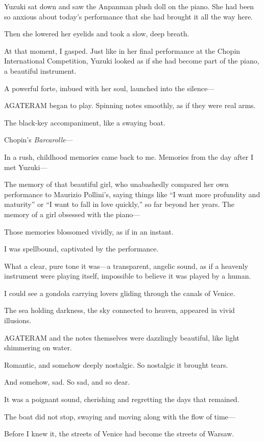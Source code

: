 \documentclass[
    a4paper,
    12pt,
    twoside,
    openany,
    UTF8,
    fontset=windows
]{ctexbook}
\begin{document}
Yuzuki sat down and saw the Anpanman plush doll on the piano. She had been so anxious about today's performance that she had brought it all the way here.

Then she lowered her eyelids and took a slow, deep breath.

At that moment, I gasped. Just like in her final performance at the Chopin International Competition, Yuzuki looked as if she had become part of the piano, a beautiful instrument.

A powerful forte, imbued with her soul, launched into the silence---

AGATERAM began to play. Spinning notes smoothly, as if they were real arms.

The black-key accompaniment, like a swaying boat.

Chopin's \textit{Barcarolle}---

In a rush, childhood memories came back to me. Memories from the day after I met Yuzuki---

The memory of that beautiful girl, who unabashedly compared her own performance to Maurizio Pollini's, saying things like ``I want more profundity and maturity'' or ``I want to fall in love quickly,'' so far beyond her years. The memory of a girl obsessed with the piano---

Those memories blossomed vividly, as if in an instant.

I was spellbound, captivated by the performance.

What a clear, pure tone it was---a transparent, angelic sound, as if a heavenly instrument were playing itself, impossible to believe it was played by a human.

I could see a gondola carrying lovers gliding through the canals of Venice.

The sea holding darkness, the sky connected to heaven, appeared in vivid illusions.

AGATERAM and the notes themselves were dazzlingly beautiful, like light shimmering on water.

Romantic, and somehow deeply nostalgic. So nostalgic it brought tears.

And somehow, sad. So sad, and so dear.

It was a poignant sound, cherishing and regretting the days that remained.

The boat did not stop, swaying and moving along with the flow of time---

Before I knew it, the streets of Venice had become the streets of Warsaw.
\end{document}
